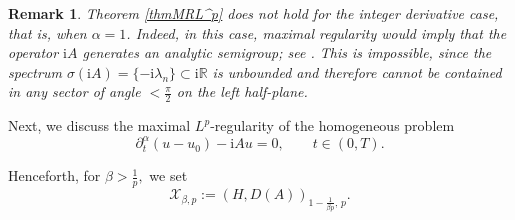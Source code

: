 \documentclass[reqno]{amsart}
\newtheorem{rmk}{Remark}
\numberwithin{equation}{section}
\begin{document}
\begin{rmk}\label{rmkcs}
Theorem \ref{thmMRL^p} does not hold for the integer derivative case, that is, when $\alpha=1$. Indeed, in this case, maximal regularity would imply that the operator $\mathrm{i} A$ generates an analytic semigroup; see \cite{Dore0}. This is impossible, since the spectrum $\sigma(\mathrm{i}A)=\{-\mathrm{i}\lambda_n\} \subset \mathrm{i}\mathbb{R}$ is unbounded and therefore cannot be contained in any sector of angle $<\frac{\pi}{2}$ on the left half-plane.
\end{rmk}

Next, we discuss the maximal $L^p$-regularity of the homogeneous problem
\begin{equation}\label{heqp}
\partial_t^\alpha (u-u_0) -\mathrm{i} Au=0, \qquad t \in (0,T).
\end{equation}

Henceforth, for $\beta >\frac{1}{p},$ we set
\begin{equation}\label{Interp}
\mathcal{X}_{\beta,p} :=(H,D(A))_{1-\frac{1}{\beta p},\,p}.
\end{equation}
\end{document}
